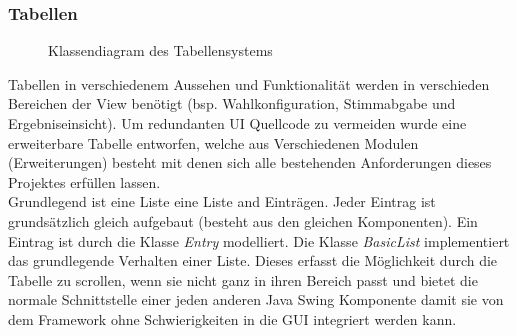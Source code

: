 \documentclass[parskip=full]{scrartcl}
\begin{document}
		\subsubsection{Tabellen}
		\begin{figure}[!h]
		\centering
		
		\caption{Klassendiagram des Tabellensystems}
		\end{figure}
		
		Tabellen in verschiedenem Aussehen und Funktionalität werden in verschieden Bereichen der View benötigt (bsp. Wahlkonfiguration, Stimmabgabe und Ergebniseinsicht). Um redundanten UI Quellcode zu vermeiden wurde eine erweiterbare Tabelle entworfen, welche aus Verschiedenen Modulen (Erweiterungen) besteht mit denen sich alle bestehenden Anforderungen dieses Projektes erfüllen lassen.
		\\
		Grundlegend ist eine Liste eine Liste and Einträgen. Jeder Eintrag ist grundsätzlich gleich aufgebaut (besteht aus den gleichen Komponenten). Ein Eintrag ist durch die Klasse \textit{Entry} modelliert. Die Klasse \textit{BasicList} implementiert das grundlegende Verhalten einer Liste. Dieses erfasst die Möglichkeit durch die Tabelle zu scrollen, wenn sie nicht ganz in ihren Bereich passt und bietet die normale Schnittstelle einer jeden anderen Java Swing Komponente damit sie von dem Framework ohne Schwierigkeiten in die GUI integriert werden kann.
		\\
\end{document}
